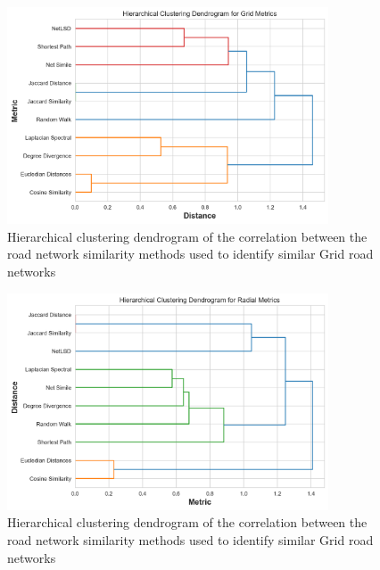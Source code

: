 
\begin{figure}[!ht]
\centering
\includegraphics[width=0.85\textwidth,center]{picture/Grid/grid_metrics_dendrogram.png}
\caption[Hierarchical Clustering Dendrogram of the Correlation between the Road Network Similarity Methods for Grid Road Networks]{Hierarchical clustering dendrogram of the correlation between the road network similarity methods used to identify similar Grid road networks}
\label{fig:Hierarchical Clustering Dendrogram of the Correlation between the Road Network Similarity Methods for Grid Road Networks}
\end{figure}


\begin{figure}[!ht]
\centering
\includegraphics[width=0.85\textwidth,center]{picture/Radial/radial_metrics_dendrogram.png}
\caption[Hierarchical Clustering Dendrogram of the Correlation between the Road Network Similarity Methods for Radial Road Networks]{Hierarchical clustering dendrogram of the correlation between the road network similarity methods used to identify similar Grid road networks}
\label{fig:Hierarchical Clustering Dendrogram of the Correlation between the Road Network Similarity Methods for Radial Road Networks}
\end{figure}
